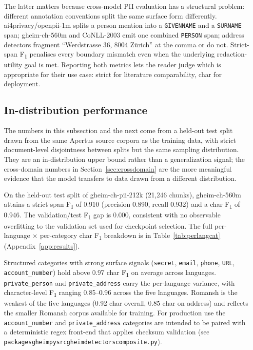 \documentclass[sigconf,nonacm]{acmart}
\newcommand*{\Bsl}{\discretionary{/}{}{/}}%
\newcommand*{\Bhy}{\discretionary{-}{}{-}}%
\begin{document}
The latter matters because cross-model PII evaluation has a structural
problem: different annotation conventions split the same surface form
differently. \textsf{ai4privacy/openpii-1m} splits a person mention
into a \texttt{GIVENNAME} and a \texttt{SURNAME} span;
\textsf{gheim-ch-560m} and CoNLL-2003 emit one combined \texttt{PERSON}
span; address detectors fragment ``Werdstrasse 36, 8004 Zürich''
at the comma or do not. Strict-span F\textsubscript{1} penalises every
boundary mismatch even when the underlying redaction-utility goal is
met. Reporting both metrics lets the reader judge which is appropriate
for their use case: strict for literature comparability, char for
deployment.

\subsection{In-distribution performance}

The numbers in this subsection and the next come from a held-out
test split drawn from the same Apertus source corpora as the
training data, with strict document-level disjointness between
splits but the same sampling distribution. They are an
in-distribution upper bound rather than a generalization signal;
the cross-domain numbers in Section~\ref{sec:crossdomain} are the
more meaningful evidence that the model transfers to data drawn
from a different distribution.

On the held-out test split of \textsf{gheim-ch-pii-212k} (21{,}246
chunks), \textsf{gheim-ch-560m} attains a strict-span F\textsubscript{1}
of 0.910 (precision 0.890, recall 0.932) and a char F\textsubscript{1}
of 0.946. The validation/test F\textsubscript{1} gap is 0.000,
consistent with no observable overfitting to the validation set
used for checkpoint selection. The full per-language $\times$
per-category char F\textsubscript{1} breakdown is in
Table~\ref{tab:perlangcat} (Appendix~\ref{app:results}).

Structured categories with strong surface signals
(\texttt{secret}, \texttt{email}, \texttt{phone}, \texttt{URL},
\texttt{account\_number}) hold above 0.97 char F\textsubscript{1}
on average across languages. \texttt{private\_person} and
\texttt{private\_address} carry the per-language variance, with
character-level F\textsubscript{1} ranging 0.85--0.96 across the
five languages. Romansh is the weakest of the five languages
(0.92 char overall, 0.85 char on address) and reflects the smaller
Romansh corpus available for training. For production use the
\texttt{account\_number} and \texttt{private\_address} categories
are intended to be paired with a deterministic regex front-end that
applies checksum validation (see
\texttt{packages\Bsl gheim\Bhy py\Bsl src\Bsl gheim\Bsl detectors\Bsl composite.py}).
\end{document}
